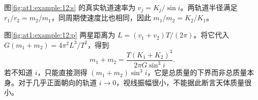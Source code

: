 \begin{solution}
  图\ref{fig:at1:example:12:s} 的真实轨道速率为 $v_j=K_j/\sin i$。两轨道半径满足 $r_1/r_2=m_2/m_1$，同周期使速度比也相同，因此 $m_1/m_2=K_2/K_1$。

  图\ref{fig:at1:example:12:p} 两星距离为 $L=(v_1+v_2)T/(2\pi)$。将它代入 $G(m_1+m_2)=4\pi^2L^3/T^2$，得到
  \[m_1+m_2=\frac{T(K_1+K_2)^3}{2\pi G\sin^3i}.\]
  若不知道 $i$，只能直接测得 $(m_1+m_2)\sin^3i$，它是总质量的下界而非总质量本身。对于几乎正面朝向的轨道 $i\to0$，视线振幅很小，不能据此断言天体质量很小。\end{solution}
